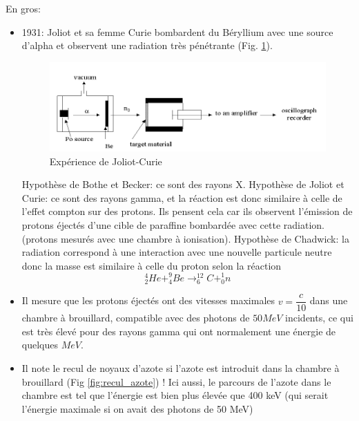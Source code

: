 En gros:
\begin{itemize}
    \item 1931: Joliot et sa femme Curie bombardent du Béryllium avec une source d'alpha et observent une radiation très pénétrante (Fig. \ref{fig:joliot_curie}).

    \begin{figure}[H]
        \centering
        \includegraphics[scale=0.99]{Images1/joliotcurie.PNG}
        \caption{Expérience de Joliot-Curie}
        \label{fig:joliot_curie}
    \end{figure}

    Hypothèse de Bothe et Becker: ce sont des rayons X. Hypothèse de Joliot et Curie: ce sont des rayons gamma, et la réaction est donc similaire à celle de l'effet compton sur des protons. Ils pensent cela car ils observent l'émission de protons éjectés d'une cible de paraffine bombardée avec cette radiation. (protons mesurés avec une chambre à ionisation). Hypothèse de Chadwick: la radiation correspond à une interaction avec une nouvelle particule neutre donc la masse est similaire à celle du proton selon la réaction
    \[
        ^{4}_{2}He + ^{9}_{4}Be \rightarrow ^{12}_{6}C + ^{1}_{0}n
    \]

    \item Il mesure que les protons éjectés ont des vitesses maximales $v=\dfrac{c}{10}$ dans une chambre à brouillard, compatible avec des photons de $50 MeV$ incidents, ce qui est très élevé pour des rayons gamma qui ont normalement une énergie de quelques $MeV$.

    \item Il note le recul de noyaux d'azote si l'azote est introduit dans la chambre à brouillard (Fig \ref{fig:recul_azote}) ! Ici aussi, le parcours de l'azote dans le chambre est tel que l'énergie est bien plus élevée que 400 keV (qui serait l'énergie maximale si on avait des photons de 50 MeV)



\end{itemize}
